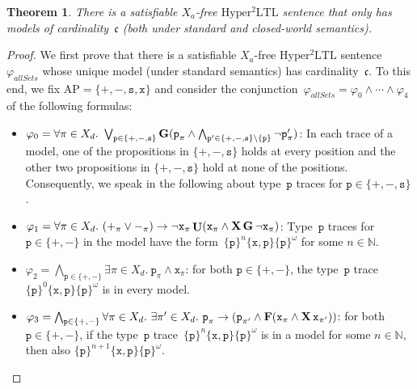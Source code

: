 \documentclass[dvipsnames,10pt,a4paper]{amsart}
\newtheorem{thm}{Theorem}[section]
\theoremstyle{definition}
\theoremstyle{remark}
\newcommand{\nats}{\mathbb{N}}
\renewcommand{\phi}{\varphi}
\newcommand{\set}[1]{\{#1\}}
\newcommand{\F}{\mathop{\mathbf{F}\vphantom{a}}\nolimits}
\newcommand{\G}{\mathop{\mathbf{G}\vphantom{a}}\nolimits}
\DeclareMathOperator{\U}{\mathbf{U}}
\newcommand{\X}{\mathop{\mathbf{X}\vphantom{a}}\nolimits}
\newcommand{\sohyltl}{\mathrm{Hyper^2LTL}\xspace}
\newcommand{\ap}[0]{\mathrm{AP}}
\newcommand{\univar}{X_a}
\newcommand{\unidisvar}{X_d}
\newcommand{\posprop}{\mathtt{+}}
\newcommand{\negprop}{\mathtt{-}}
\newcommand{\setprop}{\mathtt{s}}
\newcommand{\inprop}{\mathtt{x}}
\newcommand{\contcard}{\mathfrak{c}}
\newcommand{\proposition}{\texttt{p}}
\newcommand{\allsets}{{\mathit{allSets}}}
\begin{document}
\begin{thm}
\label{thm_modelsizelowerbound}
There is a satisfiable $\univar$-free $\sohyltl$ sentence that only has models of cardinality~$\contcard$ (both under standard and closed-world semantics).
\end{thm}

\begin{proof}
We first prove that there is a satisfiable $\univar$-free $\sohyltl$ sentence~$\phi_\allsets$  whose unique model (under standard semantics) has cardinality~$\contcard$.
To this end, we fix $\ap = \set{\posprop, \negprop,\setprop,\inprop}$ and consider the conjunction~$\phi_\allsets = \phi_0 \wedge \cdots \wedge \phi_4$ of the following formulas:
\begin{itemize}

\item $\phi_0 = \forall \pi \in \unidisvar.\ \bigvee_{\proposition \in \set{\posprop, \negprop,\setprop}} \G (\proposition_\pi \wedge \bigwedge_{\proposition' \in \set{\posprop, \negprop,\setprop} \setminus \set{\proposition}} \neg \proposition'_\pi )$: In each trace of a model, one of the propositions in $\set{\posprop, \negprop,\setprop}$ holds at every position and the other two propositions in $\set{\posprop, \negprop,\setprop}$ hold at none of the positions. Consequently, we speak in the following about type~$\proposition$ traces for $\proposition \in \set{\posprop, \negprop,\setprop}$.

\item $\phi_1 = \forall \pi \in \unidisvar.\ (\posprop_\pi \vee \negprop_\pi) \rightarrow \neg \inprop_\pi \U ( \inprop_\pi \wedge \X \G \neg \inprop_\pi )$: Type~$\proposition$ traces for $\proposition \in \set{\posprop,\negprop}$ in the model have the form~$\set{\proposition}^n \set{\inprop, \proposition} \set{\proposition}^\omega$ for some $n\in\nats$.

\item $\phi_2 = \bigwedge_{\proposition \in \set{\posprop,\negprop}} \exists\pi \in \unidisvar.\ \proposition_\pi \wedge \inprop_\pi$: for both $\proposition \in \set{\posprop,\negprop}$, the type~$\proposition$ trace $\set{\proposition}^0 \set{\inprop,\proposition} \set{\proposition}^\omega$ is in every model.

\item $\phi_3 = \bigwedge_{\proposition \in \set{\posprop,\negprop}}\forall \pi \in \unidisvar.\ \exists\pi'\in\unidisvar.\ \proposition_\pi \rightarrow ( \proposition_{\pi'} \wedge  \F (\inprop_\pi \wedge \X \inprop_{\pi'}))$: for both $\proposition \in \set{\posprop,\negprop}$, if the type~$\proposition$ trace~$\set{\proposition}^n \set{\inprop,\proposition} \set{\proposition}^\omega$ is in a model for some $n\in\nats$, then also $\set{\proposition}^{n+1} \set{\inprop,\proposition} \set{\proposition}^\omega$.
\end{itemize}


\end{proof}
\end{document}
